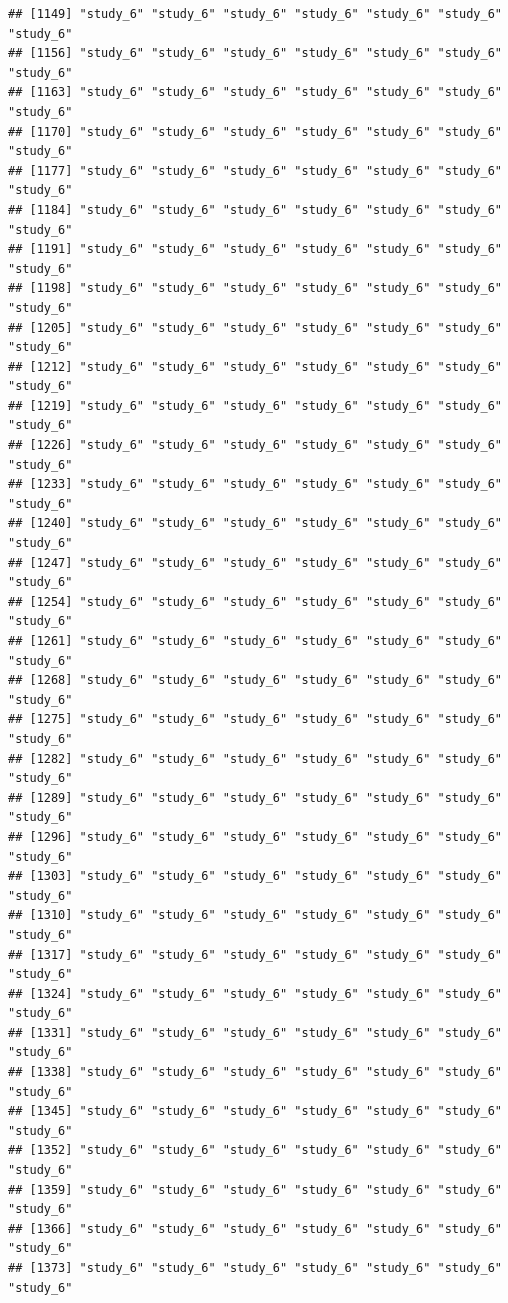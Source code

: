 \documentclass[
  american,
  man,floatsintext]{apa7}
\begin{document}
\begin{verbatim}
## [1149] "study_6" "study_6" "study_6" "study_6" "study_6" "study_6" "study_6"
## [1156] "study_6" "study_6" "study_6" "study_6" "study_6" "study_6" "study_6"
## [1163] "study_6" "study_6" "study_6" "study_6" "study_6" "study_6" "study_6"
## [1170] "study_6" "study_6" "study_6" "study_6" "study_6" "study_6" "study_6"
## [1177] "study_6" "study_6" "study_6" "study_6" "study_6" "study_6" "study_6"
## [1184] "study_6" "study_6" "study_6" "study_6" "study_6" "study_6" "study_6"
## [1191] "study_6" "study_6" "study_6" "study_6" "study_6" "study_6" "study_6"
## [1198] "study_6" "study_6" "study_6" "study_6" "study_6" "study_6" "study_6"
## [1205] "study_6" "study_6" "study_6" "study_6" "study_6" "study_6" "study_6"
## [1212] "study_6" "study_6" "study_6" "study_6" "study_6" "study_6" "study_6"
## [1219] "study_6" "study_6" "study_6" "study_6" "study_6" "study_6" "study_6"
## [1226] "study_6" "study_6" "study_6" "study_6" "study_6" "study_6" "study_6"
## [1233] "study_6" "study_6" "study_6" "study_6" "study_6" "study_6" "study_6"
## [1240] "study_6" "study_6" "study_6" "study_6" "study_6" "study_6" "study_6"
## [1247] "study_6" "study_6" "study_6" "study_6" "study_6" "study_6" "study_6"
## [1254] "study_6" "study_6" "study_6" "study_6" "study_6" "study_6" "study_6"
## [1261] "study_6" "study_6" "study_6" "study_6" "study_6" "study_6" "study_6"
## [1268] "study_6" "study_6" "study_6" "study_6" "study_6" "study_6" "study_6"
## [1275] "study_6" "study_6" "study_6" "study_6" "study_6" "study_6" "study_6"
## [1282] "study_6" "study_6" "study_6" "study_6" "study_6" "study_6" "study_6"
## [1289] "study_6" "study_6" "study_6" "study_6" "study_6" "study_6" "study_6"
## [1296] "study_6" "study_6" "study_6" "study_6" "study_6" "study_6" "study_6"
## [1303] "study_6" "study_6" "study_6" "study_6" "study_6" "study_6" "study_6"
## [1310] "study_6" "study_6" "study_6" "study_6" "study_6" "study_6" "study_6"
## [1317] "study_6" "study_6" "study_6" "study_6" "study_6" "study_6" "study_6"
## [1324] "study_6" "study_6" "study_6" "study_6" "study_6" "study_6" "study_6"
## [1331] "study_6" "study_6" "study_6" "study_6" "study_6" "study_6" "study_6"
## [1338] "study_6" "study_6" "study_6" "study_6" "study_6" "study_6" "study_6"
## [1345] "study_6" "study_6" "study_6" "study_6" "study_6" "study_6" "study_6"
## [1352] "study_6" "study_6" "study_6" "study_6" "study_6" "study_6" "study_6"
## [1359] "study_6" "study_6" "study_6" "study_6" "study_6" "study_6" "study_6"
## [1366] "study_6" "study_6" "study_6" "study_6" "study_6" "study_6" "study_6"
## [1373] "study_6" "study_6" "study_6" "study_6" "study_6" "study_6" "study_6"

\end{verbatim}
\end{document}
